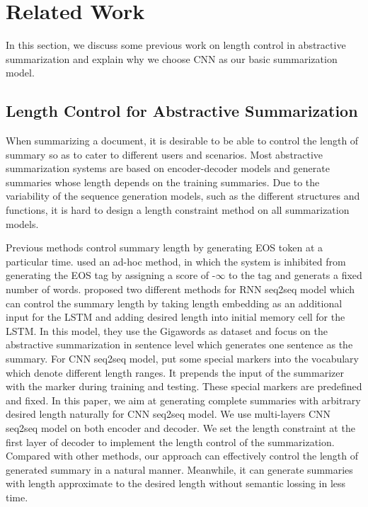 \section{Related Work}
\label{sec:related}

In this section, we discuss some previous work on length control in
abstractive summarization and explain why we choose CNN
as our basic summarization model. 

\subsection{Length Control for Abstractive Summarization}
When summarizing a document, it is desirable to be able to control
the length of summary so as to cater to different users and scenarios. 
Most abstractive summarization systems are based on encoder-decoder models
and generate summaries whose length depends on the training summaries.
Due to the variability of the sequence generation models, such 
as the different structures and functions, it is hard to design
a length constraint method on all summarization models.

Previous methods control summary length by 
generating EOS token at a particular time. 
\citet{RushCW15} used an ad-hoc method, 
in which the system is inhibited from generating the EOS tag by 
assigning a score of -$\infty$ to the tag and 
generats a fixed number of words. 
\citet{KikuchiNSTO16} proposed two
different methods for RNN seq2seq model which can 
control the summary length by taking length
embedding as an additional input for the LSTM and adding desired length into initial memory cell for the LSTM. 
In this model, they use the Gigawords as dataset and focus on 
the abstractive summarization in sentence level 
which generates one sentence as the summary.
For CNN seq2seq model, \citet{abs-1711-05217}
put some special markers into the vocabulary which denote different length ranges.
It prepends the input of the summarizer with the marker during training and testing. These special markers are predefined
and fixed. 
In this paper, we aim at generating complete summaries with arbitrary desired length 
naturally for CNN seq2seq model. We use multi-layers CNN seq2seq model on both encoder and decoder. 
We set the length constraint at the first layer of decoder to implement the length control of
the summarization. 
Compared with other methods, our approach can effectively 
control the length of generated summary in a natural manner. 
Meanwhile, it can generate summaries with length approximate
to the desired length without semantic lossing in less time. 

